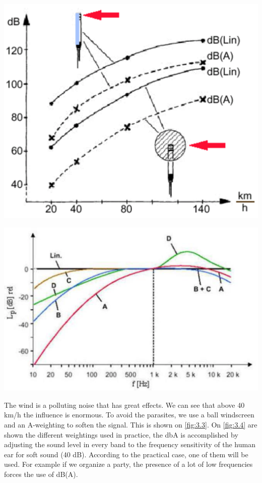 	\begin{center}
	\begin{minipage}{0.4\textwidth}
	\includegraphics[scale=0.25]{acoustics/ch3/3}
	\label{fig:3.3}
	\end{minipage}
	\begin{minipage}{0.4\textwidth}
	\includegraphics[scale=0.35]{acoustics/ch3/4}
	\label{fig:3.4}
	\end{minipage}
	\end{center}

	The wind is a polluting noise that has great effects. We can see that above 40 km/h the influence is enormous. To avoid the parasites, we use a ball windscreen and an A-weighting to soften the signal. This is shown on \autoref{fig:3.3}. On \autoref{fig:3.4} are shown the different weightings used in practice, the dbA is accomplished by adjusting the sound level in every band to the frequency sensitivity of the human ear for soft sound (40 dB). According to the practical case, one of them will be used. For example if we organize a party, the presence of a lot of low frequencies forces the use of dB(A).\\
	
